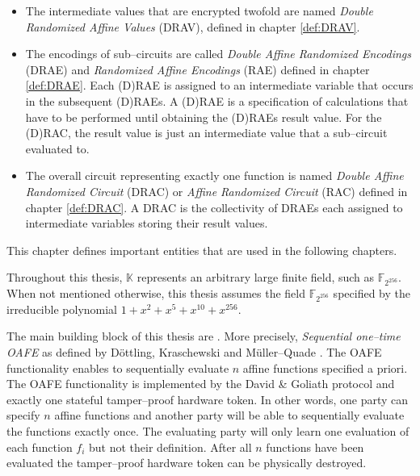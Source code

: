 \begin{itemize}

  \item The intermediate values that are encrypted twofold are named
    \emph{Double Randomized Affine Values} (DRAV), defined in chapter
    \ref{def:DRAV}.

  \item The encodings of sub--circuits are called \emph{Double Affine Randomized
    Encodings} (DRAE) and \emph{Randomized Affine Encodings} (RAE) defined in
    chapter \ref{def:DRAE}. Each (D)RAE is assigned to an intermediate variable
    that occurs in the subsequent (D)RAEs. A (D)RAE is a specification of
    calculations that have to be performed until obtaining the (D)RAEs result
    value. For the (D)RAC, the result value is just an intermediate
    value that a sub--circuit evaluated to.

  \item The overall circuit representing exactly one function is named
    \emph{Double Affine Randomized Circuit} (DRAC) or \emph{Affine Randomized
    Circuit} (RAC) defined in chapter \ref{def:DRAC}. A DRAC is the collectivity
    of DRAEs each assigned to intermediate variables storing their result
    values.

\end{itemize}


%
%
\label{sec:rae-definitions}

This chapter defines important entities that are used in the following chapters.

\label{sec:field}

\label{def:field} Throughout this thesis, $\mathbb{K}$ represents an arbitrary
large finite field, such as $\mathbb{F}_{2^{256}}$.  When not mentioned
otherwise, this thesis assumes the field $\mathbb{F}_{2^{256}}$ specified by the
irreducible polynomial $1 + x^2 + x^5 + x^{10} + x^{256}$.



The main building block of this thesis are . More precisely, \emph{Sequential one--time OAFE} as
defined by Döttling, Kraschewski and Müller--Quade \cite{davidgoliath}. The OAFE
functionality enables to sequentially evaluate $n$ affine functions specified a
priori. The OAFE functionality is implemented by the David \& Goliath protocol
\cite{davidgoliath} and exactly one stateful tamper--proof hardware token. In
other words, one party can specify $n$ affine functions and another party will
be able to sequentially evaluate the functions exactly once. The evaluating
party will only learn one evaluation of each function $f_i$ but not their
definition. After all $n$ functions have been evaluated the tamper--proof
hardware token can be physically destroyed.

